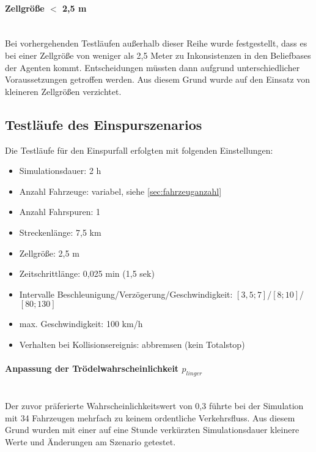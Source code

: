 \paragraph*{\texorpdfstring{Zellgröße $ < $ 2,5 m}%
                              {Zellgröße kleiner als 2,5 m}}
\hfill \\

Bei vorhergehenden Testläufen außerhalb dieser Reihe wurde festgestellt, dass es bei einer Zellgröße von weniger als 2,5 Meter zu Inkonsistenzen in den Beliefbases der Agenten kommt.
Entscheidungen müssten dann aufgrund unterschiedlicher Voraussetzungen getroffen werden.
Aus diesem Grund wurde auf den Einsatz von kleineren Zellgrößen verzichtet.






\subsection{Testläufe des Einspurszenarios}
\label{sec:test-singlelane}

Die Testläufe für den Einspurfall erfolgten mit folgenden Einstellungen:
\begin{itemize}
	\itemsep0em
	\item Simulationsdauer: 2 h
	\item Anzahl Fahrzeuge: variabel, siehe \cref{sec:fahrzeuganzahl}
	\item Anzahl Fahrspuren: 1
	\item Streckenlänge: 7,5 km 
	\item Zellgröße: 2,5 m
	\item Zeitschrittlänge: 0,025 min (1,5 sek)
	\item Intervalle Beschleunigung/Verzögerung/Geschwindigkeit: $ [3,5; 7] $/$ [8; 10] $/$ [80; 130] $
	\item max. Geschwindigkeit: 100 km/h
	\item Verhalten bei Kollisionsereignis: abbremsen (kein Totalstop)
\end{itemize}

\paragraph*{Anpassung der Trödelwahrscheinlichkeit $p_{linger}$}
\hfill \\
Der zuvor präferierte Wahrscheinlichkeitswert von 0,3 führte bei der Simulation mit 34 Fahrzeugen mehrfach zu keinem ordentliche Verkehrsfluss.
Aus diesem Grund wurden mit einer auf eine Stunde verkürzten Simulationsdauer kleinere Werte und Änderungen am Szenario getestet.

